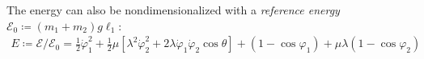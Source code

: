 \documentclass[11 pt]{article}
\begin{document}
The energy can also be nondimensionalized with a \textit{reference energy} $\mathcal{E}_0 \coloneqq (m_1+m_2) g \ell_1$:
\begin{equation}
\begin{aligned}
    E \coloneqq \mathcal{E}/\mathcal{E}_0 = \frac{1}{2}\dot \varphi_1^2 + \frac{1}{2}\mu [\lambda^2 \dot \varphi_2^2 + 2 \lambda \dot \varphi_1 \dot \varphi_2 \cos \theta] + (1 - \cos \varphi_1) + \mu \lambda (1 - \cos \varphi_2)
\end{aligned}\label{eq:energy}
\end{equation}

\end{document}
